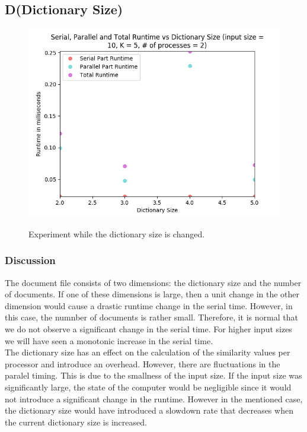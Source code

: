 \documentclass{article}
\begin{document}
\subsection{D(Dictionary Size)}

\begin{figure}[H]
\centering
\includegraphics[width=\linewidth]{assets/input_size_10_K_5_numproc_2.png}
\label{fig:test1}
\vspace{-2pt}
\caption{Experiment while the dictionary size is changed.}
\end{figure}

\subsubsection{Discussion}
\qquad The document file consists of two dimensions: the dictionary size and the number of documents. If one of these dimensions is large, then a unit change in the other dimension would cause a drastic runtime change in the serial time. However, in this case, the numnber of documents is rather small. Therefore, it is normal that we do not observe a significant change in the serial time. For higher input sizes we will have seen a monotonic increase in the serial time.\\
\null \qquad The dictionary size has an effect on the calculation of the similarity values per processor and introduce an overhead. However, there are fluctuations in the paralel timing. This is due to the smallness of the input size. If the input size was significantly large, the state of the computer would be negligible since it would not introduce a significant change in the runtime. However in the mentioned case, the dictionary size would have introduced a slowdown rate that decreases when the current dictionary size is increased.
\end{document}
